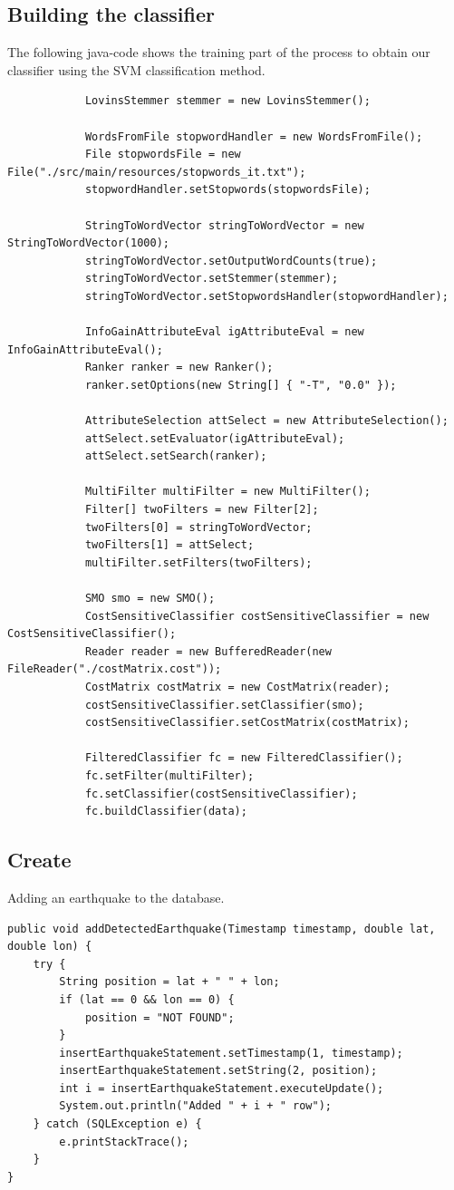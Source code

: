 \documentclass[a4paper, oneside]{article}
\begin{document}
\subsection{Building the classifier}
The following java-code shows the training part of the process to obtain our classifier using the SVM classification method.
\begin{verbatim}
			LovinsStemmer stemmer = new LovinsStemmer();

			WordsFromFile stopwordHandler = new WordsFromFile();
			File stopwordsFile = new File("./src/main/resources/stopwords_it.txt");
			stopwordHandler.setStopwords(stopwordsFile);

			StringToWordVector stringToWordVector = new StringToWordVector(1000);
			stringToWordVector.setOutputWordCounts(true);
			stringToWordVector.setStemmer(stemmer);
			stringToWordVector.setStopwordsHandler(stopwordHandler);

			InfoGainAttributeEval igAttributeEval = new InfoGainAttributeEval();
			Ranker ranker = new Ranker();
			ranker.setOptions(new String[] { "-T", "0.0" });

			AttributeSelection attSelect = new AttributeSelection();
			attSelect.setEvaluator(igAttributeEval);
			attSelect.setSearch(ranker);

			MultiFilter multiFilter = new MultiFilter();
			Filter[] twoFilters = new Filter[2];
			twoFilters[0] = stringToWordVector;
			twoFilters[1] = attSelect;
			multiFilter.setFilters(twoFilters);

			SMO smo = new SMO();
			CostSensitiveClassifier costSensitiveClassifier = new CostSensitiveClassifier();
			Reader reader = new BufferedReader(new FileReader("./costMatrix.cost"));
			CostMatrix costMatrix = new CostMatrix(reader);
			costSensitiveClassifier.setClassifier(smo);
			costSensitiveClassifier.setCostMatrix(costMatrix);

			FilteredClassifier fc = new FilteredClassifier();
			fc.setFilter(multiFilter);
			fc.setClassifier(costSensitiveClassifier);
			fc.buildClassifier(data);

\end{verbatim}


\subsection{Create}
Adding an earthquake to the database.
\vspace{2mm}
\begin{verbatim}
public void addDetectedEarthquake(Timestamp timestamp, double lat, double lon) {
    try {
        String position = lat + " " + lon;
        if (lat == 0 && lon == 0) {
            position = "NOT FOUND";
        }
        insertEarthquakeStatement.setTimestamp(1, timestamp);
        insertEarthquakeStatement.setString(2, position);
        int i = insertEarthquakeStatement.executeUpdate();
        System.out.println("Added " + i + " row");
    } catch (SQLException e) {
        e.printStackTrace();
    }
}
\end{verbatim}
\vspace{5mm}
\end{document}
